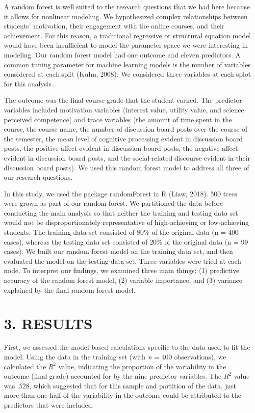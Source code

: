 \documentclass[acmart]{apa6}
\theoremstyle{definition}
\theoremstyle{definition}
\theoremstyle{definition}
\theoremstyle{remark}
\begin{document}
A random forest is well suited to the research questions that we had
here because it allows for nonlinear modeling. We hypothesized complex
relationships between students' motivation, their engagement with the
online courses, and their achievement. For this reason, a traditional
regressive or structural equation model would have been insufficient to
model the parameter space we were interesting in modeling. Our random
forest model had one outcome and eleven predictors. A common tuning
parameter for machine learning models is the number of variables
considered at each split (Kuhn, 2008): We considered three variables at
each splot for this analysis.

The outcome was the final course grade that the student earned. The
predictor variables included motivation variables (interest value,
utility value, and science perceived competence) and trace variables
(the amount of time spent in the course, the course name, the number of
discussion board posts over the course of the semester, the mean level
of cognitive processing evident in discussion board posts, the positive
affect evident in discussion board posts, the negative affect evident in
discussion board posts, and the social-related discourse evident in
their discussion board posts). We used this random forest model to
address all three of our research questions.

In this study, we used the package randomForest in R (Liaw, 2018). 500
trees were grown as part of our random forest. We partitioned the data
before conducting the main analysis so that neither the training and
testing data set would not be disproportionately representative of
high-achieving or low-achieving students. The training data set
consisted of 80\% of the original data (n = 400 cases), whereas the
testing data set consisted of 20\% of the original data (n = 99 cases).
We built our random forest model on the training data set, and then
evaluated the model on the testing data set. Three variables were tried
at each node. To interpret our findings, we examined three main things:
(1) predictive accuracy of the random forest model, (2) variable
importance, and (3) variance explained by the final random forest model.

\section{3. RESULTS}\label{results}

First, we assessed the model based calculations specific to the data
used to fit the model. Using the data in the training set (with \emph{n}
= 400 observations), we calculated the \(R^2\) value, indicating the
proportion of the variability in the outcome (final grade) accounted for
by the nine predictor variables. The \(R^2\) value was .528, which
suggested that for this sample and partition of the data, just more than
one-half of the variability in the outcome could be attributed to the
predictors that were included.
\end{document}
